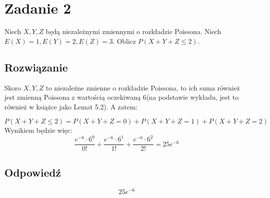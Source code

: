 \section{Zadanie 2}
Niech \(X, Y, Z\) będą niezależnymi zmiennymi o rozkładzie Poissona. Niech \(E(X) = 1, E(Y) = 2, E(Z) = 3\). Oblicz \(P(X+Y+Z \leq 2)\).

\subsection*{Rozwiązanie}
Skoro \(X,Y,Z\) to niezależne zmienne o rozkładzie Poissona, to ich suma również jest zmienną Poissona z wartością oczekiwaną 6(na podstawie wykładu, jest to również w książce jako Lemat 5.2). A zatem:


\[
	P(X+Y+Z \leq 2) = P(X+Y+Z = 0) + P(X+Y+Z = 1) + P(X+Y+Z = 2)
\]
Wynikiem będzie więc:
\[
	\frac{e^{-6} \cdot 6^0}{0!} + \frac{e^{-6} \cdot 6^1}{1!} + \frac{e^{-6} \cdot 6^2}{2!} = 25e^{-6}
\]

\subsection*{Odpowiedź}
\[
	\boxed{25e^{-6}}
\]
